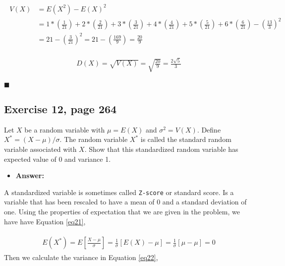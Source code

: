 \documentclass{article}
\begin{document}
 \begin{eqnarray}
\label{eq19}
\begin{split}
V(X) &= E(X^2) - E(X)^2 \\
&= 1* \left(\frac{1}{21}\right) + 2 * \left(\frac{2}{21}\right) + 3*\left(\frac{3}{21}\right) +4*\left(\frac{4}{21}\right) +5*\left(\frac{5}{21}\right) +6*\left(\frac{6}{21}\right) - \left(\frac{13}{3}\right)^2\\
& = 21 - \left(\frac{3}{21}\right)^2 = 21 - \left(\frac{169}{9}\right) = \frac{20}{9}
\end{split}
\end{eqnarray}

 \begin{eqnarray}
\label{eq20}
\begin{split}
D(X) = \sqrt{V(X)} = \sqrt{\frac{20}{9}} = \frac{2\sqrt{5}}{3}
\end{split}
\end{eqnarray}

\begin{flushright}
$\blacksquare$
\end{flushright}


\subsection{Exercise 12, page 264}

Let $X$ be a random variable with $\mu = E(X)$ and $\sigma^2 = V(X)$. Define $X^* = (X - \mu)/ \sigma$. The random variable $X^*$ is called the standard random variable associated with $X$. Show that this standardized random variable has expected value of 0 and variance 1.\\

\begin{itemize}
\item \textbf{Answer:}
\end{itemize}

A standardized variable is sometimes called \texttt{Z-score} or standard score. Is a variable that has been rescaled to have a mean of 0 and a standard deviation of one. Using the properties of expectation that we are given in the problem, we have have Equation \ref{eq21},

 \begin{eqnarray}
\label{eq21}
\begin{split}
E(X^*) = E\left[\frac{X - \mu}{\sigma}\right] = \frac{1}{\sigma}[E(X) - \mu] = \frac{1}{\sigma} [\mu-\mu] =0
\end{split}
\end{eqnarray}
 Then we calculate the variance in Equation \ref{eq22},
 
\end{document}
